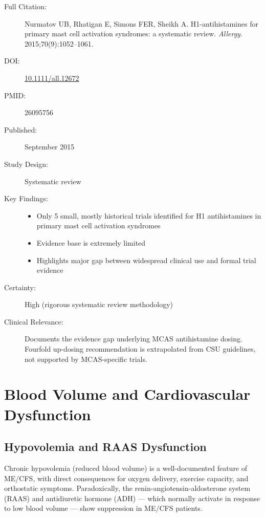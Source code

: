 \begin{description}
    \item[Full Citation:] Nurmatov UB, Rhatigan E, Simons FER, Sheikh A. H1-antihistamines for primary mast cell activation syndromes: a systematic review. \textit{Allergy}. 2015;70(9):1052--1061.
    \item[DOI:] \href{https://doi.org/10.1111/all.12672}{10.1111/all.12672}
    \item[PMID:] 26095756
    \item[Published:] September 2015
    \item[Study Design:] Systematic review
    \item[Key Findings:]
    \begin{itemize}
        \item Only 5 small, mostly historical trials identified for H1 antihistamines in primary mast cell activation syndromes
        \item Evidence base is extremely limited
        \item Highlights major gap between widespread clinical use and formal trial evidence
    \end{itemize}
    \item[Certainty:] High (rigorous systematic review methodology)
    \item[Clinical Relevance:] Documents the evidence gap underlying MCAS antihistamine dosing. Fourfold up-dosing recommendation is extrapolated from CSU guidelines, not supported by MCAS-specific trials.
\end{description}

\section{Blood Volume and Cardiovascular Dysfunction}
\label{sec:bib-blood-volume}

\subsection{Hypovolemia and RAAS Dysfunction}

Chronic hypovolemia (reduced blood volume) is a well-documented feature of ME/CFS, with direct consequences for oxygen delivery, exercise capacity, and orthostatic symptoms. Paradoxically, the renin-angiotensin-aldosterone system (RAAS) and antidiuretic hormone (ADH) --- which normally activate in response to low blood volume --- show suppression in ME/CFS patients.

